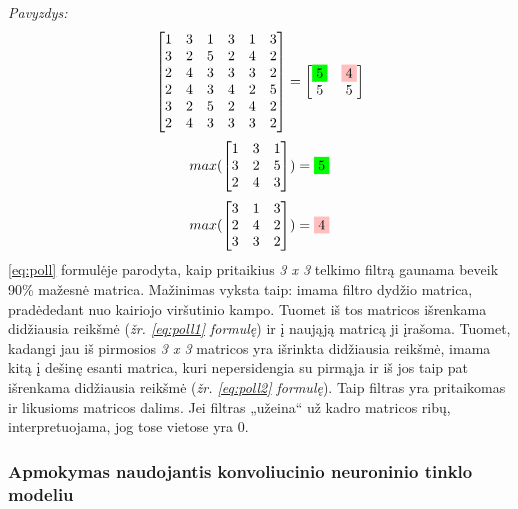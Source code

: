 \documentclass{VUMIFInfKursinis}
\begin{document}
\textit{Pavyzdys:}
\begin{equation}\label{eq:poll}
	\begin{bmatrix}
	1 & 3 & 1 & 3 & 1 & 3 \\
	3 & 2 & 5 & 2 & 4 & 2 \\
	2 & 4 & 3 & 3 & 3 & 2 \\
	2 & 4 & 3 & 4 & 2 & 5 \\
	3 & 2 & 5 & 2 & 4 & 2 \\
	2 & 4 & 3 & 3 & 3 & 2
	\end{bmatrix}
	= 
	\begin{bmatrix}
	\colorbox{green}{5} & \colorbox{pink}{4} \\
	5 & 5 
	\end{bmatrix}
\end{equation}
\begin{equation}\label{eq:poll1}
	max(
	\begin{bmatrix}
	1 & 3 & 1 \\
	3 & 2 & 5 \\
	2 & 4 & 3
	\end{bmatrix}
	) = \colorbox{green}{5}
\end{equation}
\begin{equation}\label{eq:poll2}
	max(
	\begin{bmatrix}
	3 & 1 & 3 \\
	2 & 4 & 2 \\
	3 & 3 & 2
	\end{bmatrix}
	) = \colorbox{pink}{4}
\end{equation}
\ref{eq:poll} formulėje parodyta, kaip pritaikius \textit{3 x 3} telkimo filtrą gaunama beveik 90\% mažesnė matrica. Mažinimas vyksta taip: imama filtro dydžio matrica, pradėdedant nuo kairiojo viršutinio kampo. Tuomet iš tos matricos išrenkama didžiausia reikšmė (\textit{žr. \ref{eq:poll1} formulę}) ir į naująją matricą ji įrašoma. Tuomet, kadangi jau iš pirmosios \textit{3 x 3} matricos yra išrinkta didžiausia reikšmė, imama kitą į dešinę esanti matrica, kuri nepersidengia su pirmąja ir iš jos taip pat išrenkama didžiausia reikšmė (\textit{žr. \ref{eq:poll2} formulę}). Taip filtras yra pritaikomas ir likusioms matricos dalims. Jei filtras „užeina“ už kadro matricos ribų, interpretuojama, jog tose vietose yra 0.

\subsubsection{Apmokymas naudojantis konvoliucinio neuroninio tinklo modeliu}
\end{document}
